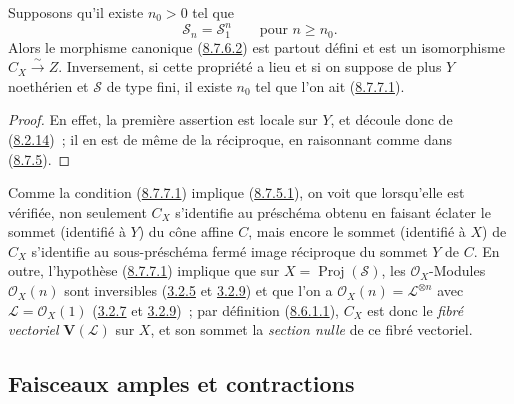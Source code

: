 \begin{corollary}[8.7.7]
\label{II.8.7.7-fr}
Supposons qu'il existe $n_0>0$ tel que
\begin{equation}
\label{II.8.7.7.1-fr}
  \mathcal{S}_n=\mathcal{S}_1^n
  \qquad\text{pour }n\geqslant n_0.
\tag{8.7.7.1}
\end{equation}
Alors le morphisme canonique (\hyperref[II.8.7.6.2-fr]{8.7.6.2}) est partout
défini et est un isomorphisme $C_X\xrightarrow{\sim}Z$. Inversement, si cette
propriété a lieu et si on suppose de plus $Y$ noethérien et $\mathcal{S}$ de
type fini, il existe $n_0$ tel que l'on ait
(\hyperref[II.8.7.7.1-fr]{8.7.7.1}).
\end{corollary}

\begin{proof}
En effet, la première assertion est locale sur $Y$, et découle donc de
(\hyperref[II.8.2.14-fr]{8.2.14})~; il en est de même de la réciproque, en
raisonnant comme dans (\hyperref[II.8.7.5-fr]{8.7.5}).
\end{proof}

\begin{remark}[8.7.8]
\label{II.8.7.8-fr}
Comme la condition (\hyperref[II.8.7.7.1-fr]{8.7.7.1}) implique
(\hyperref[II.8.7.5.1-fr]{8.7.5.1}), on voit que lorsqu'elle est vérifiée,
non seulement $C_X$ s'identifie au préschéma obtenu en faisant éclater le
sommet (identifié à $Y$) du cône affine $C$, mais encore le sommet (identifié
à $X$) de $C_X$ s'identifie au sous-préschéma fermé image réciproque du
sommet $Y$ de $C$. En outre, l'hypothèse
(\hyperref[II.8.7.7.1-fr]{8.7.7.1}) implique que sur
$X=\operatorname{Proj}(\mathcal{S})$, les $\mathcal{O}_X$-Modules
$\mathcal{O}_X(n)$ sont inversibles (\hyperref[II.3.2.5-fr]{3.2.5} et
\hyperref[II.3.2.9-fr]{3.2.9}) et que l'on a
$\mathcal{O}_X(n)=\mathcal{L}^{\otimes n}$ avec
$\mathcal{L}=\mathcal{O}_X(1)$ (\hyperref[II.3.2.7-fr]{3.2.7} et
\hyperref[II.3.2.9-fr]{3.2.9})~; par définition
(\hyperref[II.8.6.1.1-fr]{8.6.1.1}), $C_X$ est donc le \emph{fibré vectoriel}
$\mathbf{V}(\mathcal{L})$ sur $X$, et son sommet la \emph{section nulle} de ce
fibré vectoriel.
\end{remark}

\subsection{Faisceaux amples et contractions}
\label{subsection:II.8.8-fr}

